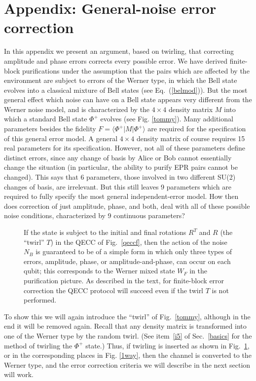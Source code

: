 \section{Appendix: General-noise error correction}
\label{twirlout}
In this appendix we present an argument, based on
twirling, that correcting amplitude and phase errors corrects
every possible error.
We have derived finite-block purifications under the assumption that
the pairs which are affected by the environment are subject to errors
of the Werner type, in which the Bell state evolves into a classical
mixture of Bell states (see Eq.~(\ref{belmod})).  But the most general
effect which noise can have on a Bell state appears very different
from the Werner noise model, and is characterized by the $4\times 4$
density matrix $M$ into which a standard Bell state $\Phi^+$ evolves
(see Fig. \ref{tommy}).  Many additional parameters besides the
fidelity $F=\langle\Phi^+|M|\Phi^+\rangle$ are required for the
specification of this general error model.  A general $4\times 4$
density matrix of course requires 15 real parameters for its
specification.  However, not all of these parameters define distinct
errors, since any change of basis by Alice or Bob cannot essentially
change the situation (in particular, the ability to purify EPR pairs
cannot be changed).  This says that 6 parameters, those involved in
two different SU(2) changes of basis, are irrelevant.  But this still
leaves 9 parameters which are required to fully specify the most
general independent-error model\cite{foot3}.  How then does correction
of just amplitude, phase, and both, deal with all of these possible
noise conditions, characterized by 9 continuous parameters?
\begin{figure}[htbp]
\centerline{}
\caption[EPP9.eps Twirl need not be performed]
{If the state is subject to the initial and final rotations
$R^T$ and $R$ (the ``twirl'' $T$) in the QECC of Fig.~\protect\ref{qeccf},
then the action of the noise $N_B$ is guaranteed to be of a simple form
in which only three types of errors, amplitude, phase, or
amplitude-and-phase, can occur on each qubit\protect\cite{EM}; this
corresponds to the Werner mixed state $W_F$ in the purification picture.
As described in the text, for finite-block error correction the QECC
protocol will succeed even if the twirl $T$ is not performed.}
\label{newt}
\end{figure}
 
To show this we will again introduce the ``twirl'' of
Fig.~\ref{tommy}, although in the end it will be removed again.
Recall that any density matrix is transformed into one of the Werner
type by the random twirl.  (See item~\ref{i5} of Sec.~\ref{basics} for
the method of twirling the $\Phi^+$ state.)  Thus, if twirling is
inserted as shown in Fig.~\ref{newt}, or in the corresponding places
in Fig. \ref{1way}, then the channel is converted to the Werner type,
and the error correction criteria we will describe in the next section
will work.
 
